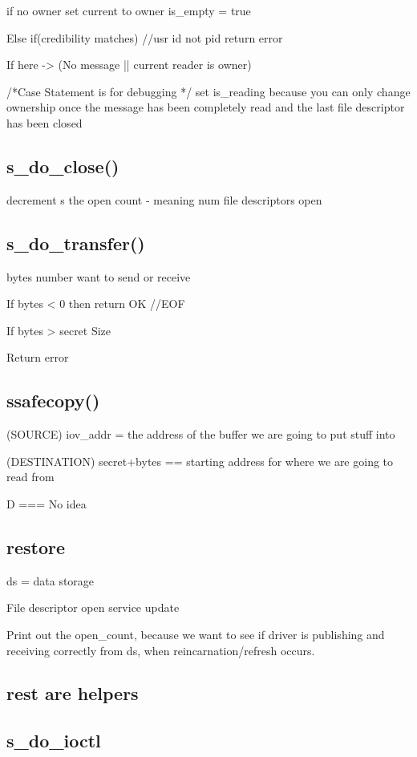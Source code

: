 \documentclass[11pt]{article}
\begin{document}
   if no owner
      set current to owner
      is\_empty = true 

   Else if(credibility matches) //usr id not pid
      return error

   If here -> (No message || current reader is owner)

   /*Case Statement is for debugging */
   set is\_reading because you can only change ownership once the message has been completely read and the last file descriptor has been closed



\subsection{s\_do\_close()}
   decrement s the open count
      - meaning  num file descriptors open


\subsection{s\_do\_transfer()}
   bytes number want to send or receive

   If bytes < 0 then return OK //EOF

   If bytes > secret Size 

      Return error



\subsection{ssafecopy()}
   (SOURCE)
   iov\_addr = the address of the buffer we are going to put stuff into

   (DESTINATION)
   secret+bytes == starting address for where we are going to read from

   D === No idea

   

\subsection{restore}
   ds = data storage

   File descriptor open
   service update 

   Print out the open\_count, because we want to see if driver is publishing and receiving correctly from ds, when reincarnation/refresh occurs.
   
\subsection{rest are helpers}


\subsection{s\_do\_ioctl}
\end{document}
